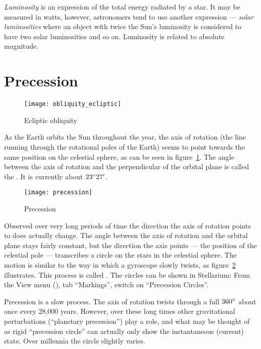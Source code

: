 \emph{Luminosity} is an expression of the total energy radiated by a
star. It may be measured in watts, however, astronomers tend to use
another expression --- \emph{solar luminosities} where an object with
twice the Sun's luminosity is considered to have two solar luminosities
and so on. Luminosity is related to absolute magnitude.

\section{Precession}
\label{sec:Concepts:Precession}

\begin{figure}[htb]
\centering\texttt{[image: obliquity\_ecliptic]}
\caption{Ecliptic obliquity}
\label{fig:Obliquity}
\end{figure}

As the Earth orbits the Sun throughout the year, the axis of rotation
(the line running through the rotational poles of the Earth) seems
to point towards the same position on the celestial sphere, as can be
seen in figure~\ref{fig:Obliquity}. The angle between the axis
of rotation and the perpendicular of the orbital plane is called the
. It is currently about $23\degree27'$.

\begin{figure}[htb]
\centering\texttt{[image: precession]}
\caption{Precession}
\label{fig:Precession}
\end{figure}


Observed over very long periods of time the direction the axis of
rotation points to does actually change. The angle between the axis of
rotation and the orbital plane stays fairly constant, but the
direction the axis points --- the position of the celestial pole ---
transcribes a circle on the stars in the celestial sphere. The motion
is similar to the way in which a gyroscope slowly twists, as
figure~\ref{fig:Precession} illustrates. This process is called
. The circles can be shown in Stellarium: From
the View menu (), tab ``Markings'', switch on ``Precession
Circles''.

Precession is a slow process. The axis of rotation twists through a
full $360\degree$ about once every 28,000 years. However, over these
long times other gravitational perturbations (``planetary
precession'') play a role, and what may be thought of as rigid
``precession circle'' can actually only show the instantaneous
(current) state. Over millennia the circle slightly varies.

